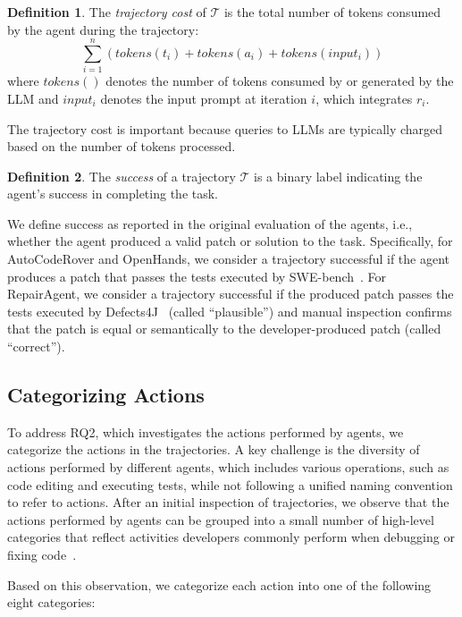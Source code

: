 \documentclass[conference,10pt]{IEEEtran}
\theoremstyle{definition}        %
\newtheorem{definition}{Definition}
\newcommand{\ra}{Repair\-Agent}
\newcommand{\oh}{Open\-Hands}
\newcommand{\acr}{Auto\-Code\-Rover}
\begin{document}
\begin{definition}
The \emph{trajectory cost} of $\mathcal{T}$ is the total number of tokens consumed by the agent during the trajectory:
$$\sum_{i=1}^{n} \left( \mathit{tokens}(t_i) + \mathit{tokens}(a_i) + \mathit{tokens}(input_i) \right)$$
where $\mathit{tokens}()$ denotes the number of tokens consumed by or generated by the LLM and $\mathit{input_i}$ denotes the input prompt at iteration $\mathit{i}$, which integrates $\mathit{r_i}$.
\end{definition}


The trajectory cost is important because queries to LLMs are typically charged based on the number of tokens processed.

\begin{definition}
The \emph{success} of a trajectory $\mathcal{T}$ is a binary label indicating the agent's success in completing the task.	
\end{definition}

We define success as reported in the original evaluation of the agents, i.e., whether the agent produced a valid patch or solution to the task.
Specifically, for \acr{} and \oh{}, we consider a trajectory successful if the agent produces a patch that passes the tests executed by SWE-bench~\cite{Jimenez2023}.
For \ra{}, we consider a trajectory successful if the produced patch passes the tests executed by Defects4J~\cite{Just2014} (called ``plausible'') and manual inspection confirms that the patch is equal or semantically to the developer-produced patch (called ``correct'').


\subsection{Categorizing Actions}

To address RQ2, which investigates the actions performed by agents, we categorize the actions in the trajectories.
A key challenge is the diversity of actions performed by different agents, which includes various operations, such as code editing and executing tests, while not following a unified naming convention to refer to actions.
After an initial inspection of trajectories, we observe that the actions performed by agents can be grouped into a small number of high-level categories that reflect activities developers commonly perform when debugging or fixing code~\cite{zeller2009programs}. 


Based on this observation, we categorize each action into one of the following eight categories:
\end{document}
